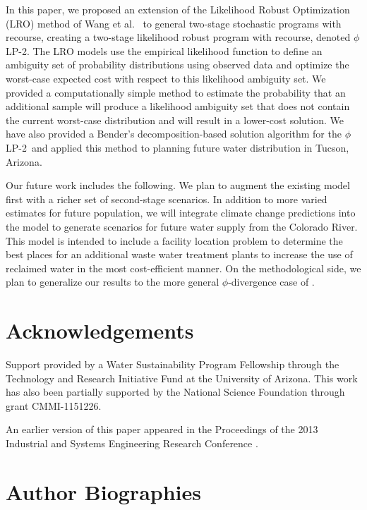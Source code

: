 \documentclass[11pt]{article}
\newcommand{\plp}{$\phi$LP-2}
\begin{document}
In this paper, we proposed an extension of the Likelihood Robust Optimization (LRO) method of Wang et al.\ \cite{wang2010likelihood} to general two-stage stochastic programs with recourse, creating a two-stage likelihood robust program with recourse, denoted \plp.
The LRO models use the empirical likelihood function to define an ambiguity set of probability distributions using observed data and optimize the worst-case expected cost with respect to this likelihood ambiguity set.
We provided a computationally simple method to estimate the probability that an additional sample will produce a likelihood ambiguity set that does not contain the current worst-case distribution and will result in a lower-cost solution. 
We have also provided a Bender's decomposition-based solution algorithm for the \plp\ and applied this method to planning future water distribution in Tucson, Arizona.

Our future work includes the following. We plan to augment the existing model first with a richer set of second-stage scenarios.
In addition to more varied estimates for future population, we will integrate climate change predictions into the model to generate scenarios for future water supply from the Colorado River. 
This model is intended to include a facility location problem to determine the best places for an additional waste water treatment plants to increase the use of reclaimed water in the most cost-efficient manner. On the methodological side, we plan to generalize our results to the more general $\phi$-divergence case of \cite{bental2011robust}.

\section*{Acknowledgements}
Support provided by a Water Sustainability Program Fellowship through the Technology and Research Initiative Fund at the University of Arizona.
This work has also been partially supported by the National Science Foundation through grant CMMI-1151226.

An earlier version of this paper appeared in the Proceedings of the 2013 Industrial and Systems Engineering Research Conference \cite{love2013likelihood}.





\section*{Author Biographies}
\end{document}
